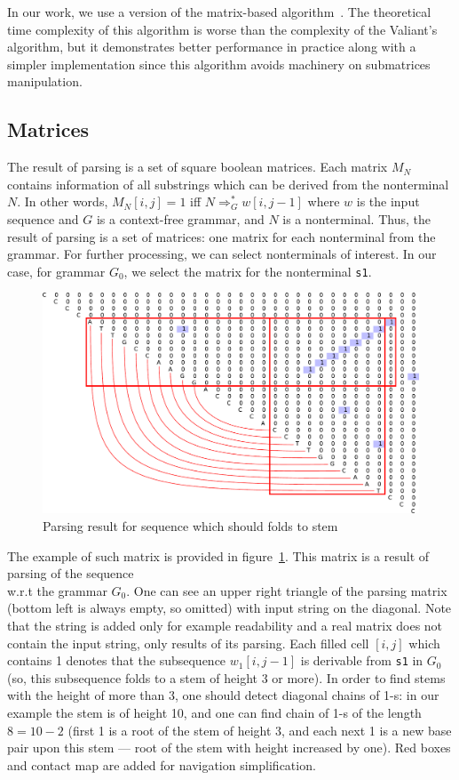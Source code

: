 \documentclass[a4paper,twoside]{article}
\begin{document}
In our work, we use a version of the matrix-based algorithm~\cite{Azimov:2018:CPQ:3210259.3210264}.
The theoretical time complexity of this algorithm is worse than the complexity of the Valiant's algorithm, but it demonstrates better performance in practice along with a simpler implementation since this algorithm avoids machinery on submatrices manipulation.

\subsection{Matrices}

\noindent The result of parsing is a set of square boolean matrices. 
Each matrix $M_N$ contains information of all substrings which can be derived from the nonterminal $N$.
In other words, $M_N[i,j]=1$ iff $N \Rightarrow^*_G w[i,j-1]$ where $w$ is the input sequence and $G$ is a context-free grammar, and $N$ is a nonterminal.
Thus, the result of parsing is a set of matrices: one matrix for each nonterminal from the grammar.
For further processing, we can select nonterminals of interest.
In our case, for grammar $G_0$, we select the matrix for the nonterminal \verb|s1|.

\begin{figure}
\centering
\includegraphics[width=.45\textwidth]{figures/4.pdf}
\caption{Parsing result for sequence which should folds to stem}
\label{fig:matrix-simple-stem}
\end{figure}

The example of such matrix is provided in figure~\ref{fig:matrix-simple-stem}.
This matrix is a result of parsing of the sequence {  \\} w.r.t the grammar $G_0$.
One can see an upper right triangle of the parsing matrix (bottom left is always empty, so omitted) with input string on the diagonal.
Note that the string is added only for example readability and a real matrix does not contain the input string, only results of its parsing.
Each filled cell $[i,j]$ which contains 1 denotes that the subsequence $w_1[i,j-1]$ is derivable from \verb|s1| in $G_0$ (so, this subsequence folds to a stem of height 3 or more).
In order to find stems with the height of more than 3, one should detect diagonal chains of 1-s: in our example the stem is of height 10, and one can find chain of 1-s of the length $8=10-2$ (first 1 is a root of the stem of height 3, and each next 1 is a new base pair upon this stem --- root of the stem with height increased by one).
Red boxes and contact map are added for navigation simplification.
\end{document}
